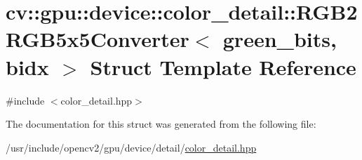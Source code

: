 \hypertarget{structcv_1_1gpu_1_1device_1_1color__detail_1_1RGB2RGB5x5Converter}{\section{cv\-:\-:gpu\-:\-:device\-:\-:color\-\_\-detail\-:\-:R\-G\-B2\-R\-G\-B5x5\-Converter$<$ green\-\_\-bits, bidx $>$ Struct Template Reference}
\label{structcv_1_1gpu_1_1device_1_1color__detail_1_1RGB2RGB5x5Converter}
}


{\ttfamily \#include $<$color\-\_\-detail.\-hpp$>$}



The documentation for this struct was generated from the following file\-:\begin{DoxyCompactItemize}
\item 
/usr/include/opencv2/gpu/device/detail/\hyperlink{color__detail_8hpp}{color\-\_\-detail.\-hpp}\end{DoxyCompactItemize}
